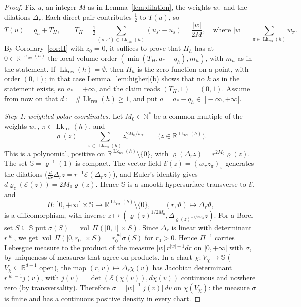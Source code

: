\documentclass[11pt,a4paper]{article}
\theoremstyle{definition}
\theoremstyle{remark}
\numberwithin{equation}{section}
\newcommand{\N}{\mathbb{N}}
\newcommand{\R}{\mathbb{R}}
\newcommand{\vol}{\operatorname{vol}}
\newcommand{\abs}[1]{\lvert #1\rvert}
\newcommand{\Lk}{\operatorname{Lk}}
\begin{document}
\begin{proof}
Fix $u$, an integer $M$ as in Lemma~\ref{lem:dilation}, the weights $w_\pi$ and the dilations $\Delta_r$. Each direct pair contributes $\frac12$ to $T(u)$, so
\[
T(u)=q_h+T_H,\qquad T_H=\tfrac12\sum_{(s,s')\in\Lk_{\mathrm{res}}(h)}(u_{s'}-u_s)=\frac{\abs w}{2M},\quad\text{where }\abs w=\sum_{\pi\in\Lk_{\mathrm{res}}(h)}w_\pi .
\]
By Corollary~\ref{cor:H} with $z_0=0$, it suffices to prove that $H_h$ has at $0\in\R^{\Lk_{\mathrm{res}}(h)}$ the local volume order $(\min(T_H,a_*-q_h),m_h)$, with $m_h$ as in the statement. If $\Lk_{\mathrm{res}}(h)=\emptyset$, then $H_h$ is the zero function on a point, with order $(0,1)$; in that case Lemma~\ref{lem:higher}(b) shows that no $k$ as in the statement exists, so $a_*=+\infty$, and the claim reads $(T_H,1)=(0,1)$. Assume from now on that $d:=\#\Lk_{\mathrm{res}}(h)\ge1$, and put $a=a_*-q_h\in\,]-\infty,+\infty]$.

\emph{Step 1: weighted polar coordinates.} Let $M_0\in\N^*$ be a common multiple of the weights $w_\pi$, $\pi\in\Lk_{\mathrm{res}}(h)$, and
\[
\varrho(z)=\sum_{\pi\in\Lk_{\mathrm{res}}(h)}z_\pi^{2M_0/w_\pi}\qquad\bigl(z\in\R^{\Lk_{\mathrm{res}}(h)}\bigr).
\]
This is a polynomial, positive on $\R^{\Lk_{\mathrm{res}}(h)}\setminus\{0\}$, with $\varrho(\Delta_rz)=r^{2M_0}\varrho(z)$. The set $\mathbb S=\varrho^{-1}(1)$ is compact. The vector field $\mathcal E(z)=(w_\pi z_\pi)_\pi$ generates the dilations ($\frac{d}{dr}\Delta_rz=r^{-1}\mathcal E(\Delta_rz)$), and Euler's identity gives $d\varrho_z(\mathcal E(z))=2M_0\varrho(z)$. Hence $\mathbb S$ is a smooth hypersurface transverse to $\mathcal E$, and
\[
\Pi:\,]0,+\infty[\,\times\mathbb S\to\R^{\Lk_{\mathrm{res}}(h)}\setminus\{0\},\qquad(r,\vartheta)\mapsto\Delta_r\vartheta,
\]
is a diffeomorphism, with inverse $z\mapsto(\varrho(z)^{1/2M_0},\Delta_{\varrho(z)^{-1/2M_0}}z)$. For a Borel set $S\subseteq\mathbb S$ put $\sigma(S)=\vol\,\Pi(]0,1[\,\times S)$. Since $\Delta_r$ is linear with determinant $r^{\abs w}$, we get $\vol\,\Pi(]0,r_0[\,\times S)=r_0^{\abs w}\sigma(S)$ for $r_0>0$. Hence $\Pi^{-1}$ carries Lebesgue measure to the product of the measure $\abs w\,r^{\abs w-1}dr$ on $]0,+\infty[$ with $\sigma$, by uniqueness of measures that agree on products. In a chart $\chi:V_\chi\to\mathbb S$ ($V_\chi\subseteq\R^{d-1}$ open), the map $(r,v)\mapsto\Delta_r\chi(v)$ has Jacobian determinant $r^{\abs w-1}j(v)$, with $j(v)=\det(\mathcal E(\chi(v)),d\chi(v))$ continuous and nowhere zero (by transversality). Therefore $\sigma=\abs w^{-1}\abs{j(v)}\,dv$ on $\chi(V_\chi)$: the measure $\sigma$ is finite and has a continuous positive density in every chart.


\end{proof}
\end{document}
